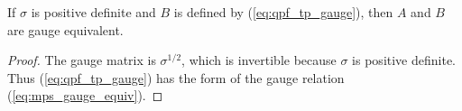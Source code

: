 \begin{lemma}%
    \label{lem:tp_gauge_equiv}
    \leanok
    If $\sigma$ is positive definite and $B$ is defined by
    (\ref{eq:qpf_tp_gauge}), then $A$ and $B$ are gauge equivalent.
\end{lemma}

\begin{proof}\leanok
    The gauge matrix is $\sigma^{1/2}$, which is invertible because
    $\sigma$ is positive definite. Thus (\ref{eq:qpf_tp_gauge}) has the form
    of the gauge relation (\ref{eq:mps_gauge_equiv}).
\end{proof}
